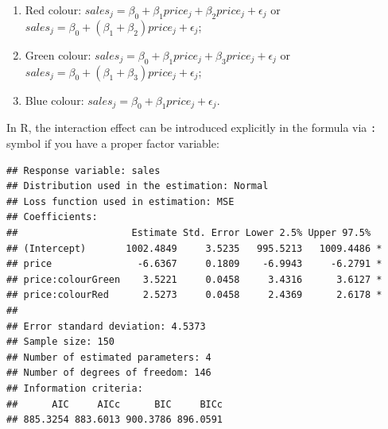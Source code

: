\documentclass[
]{book}
\newenvironment{Shaded}{\begin{snugshade}}{\end{snugshade}}
\newcommand{\AttributeTok}[1]{\textcolor[rgb]{0.13,0.29,0.53}{#1}}
\newcommand{\CommentTok}[1]{\textcolor[rgb]{0.56,0.35,0.01}{\textit{#1}}}
\newcommand{\DecValTok}[1]{\textcolor[rgb]{0.00,0.00,0.81}{#1}}
\newcommand{\FunctionTok}[1]{\textcolor[rgb]{0.13,0.29,0.53}{\textbf{#1}}}
\newcommand{\NormalTok}[1]{#1}
\newcommand{\OtherTok}[1]{\textcolor[rgb]{0.56,0.35,0.01}{#1}}
\newcommand{\SpecialCharTok}[1]{\textcolor[rgb]{0.81,0.36,0.00}{\textbf{#1}}}
\newcommand{\StringTok}[1]{\textcolor[rgb]{0.31,0.60,0.02}{#1}}
\providecommand{\tightlist}{%
  \setlength{\itemsep}{0pt}\setlength{\parskip}{0pt}}
\theoremstyle{definition}
\theoremstyle{definition}
\theoremstyle{definition}
\theoremstyle{definition}
\theoremstyle{remark}
\begin{document}
\begin{enumerate}
\def\labelenumi{\arabic{enumi}.}
\tightlist
\item
  Red colour: \(sales_j = \beta_0 + \beta_1 price_j + \beta_2 price_j + \epsilon_j\) or \(sales_j = \beta_0 + (\beta_1 + \beta_2) price_j + \epsilon_j\);
\item
  Green colour: \(sales_j = \beta_0 + \beta_1 price_j + \beta_3 price_j + \epsilon_j\) or \(sales_j = \beta_0 + (\beta_1 + \beta_3) price_j + \epsilon_j\);
\item
  Blue colour: \(sales_j = \beta_0 + \beta_1 price_j + \epsilon_j\).
\end{enumerate}

In R, the interaction effect can be introduced explicitly in the formula via \texttt{:} symbol if you have a proper factor variable:

\begin{Shaded}
\end{Shaded}

\begin{verbatim}
## Response variable: sales
## Distribution used in the estimation: Normal
## Loss function used in estimation: MSE
## Coefficients:
##                    Estimate Std. Error Lower 2.5% Upper 97.5%  
## (Intercept)       1002.4849     3.5235   995.5213   1009.4486 *
## price               -6.6367     0.1809    -6.9943     -6.2791 *
## price:colourGreen    3.5221     0.0458     3.4316      3.6127 *
## price:colourRed      2.5273     0.0458     2.4369      2.6178 *
## 
## Error standard deviation: 4.5373
## Sample size: 150
## Number of estimated parameters: 4
## Number of degrees of freedom: 146
## Information criteria:
##      AIC     AICc      BIC     BICc 
## 885.3254 883.6013 900.3786 896.0591
\end{verbatim}
\end{document}
